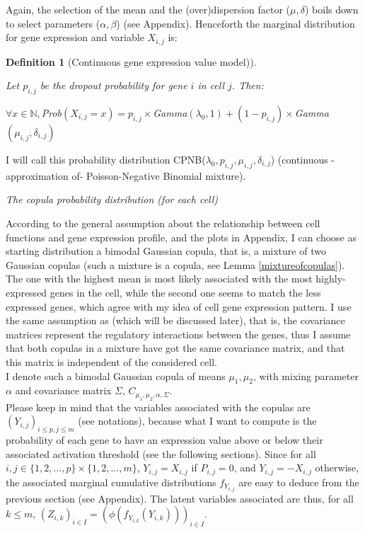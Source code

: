 \documentclass{report}
\newtheorem{definition}{Definition}[section]
\begin{document}
{Again, the selection of the mean and the (over)dispersion factor ($\mu, \delta$) boils down to select parameters ($\alpha, \beta$) (see Appendix). Henceforth the marginal distribution for gene expression and variable $X_{i,j}$ is:

\begin{definition}[Continuous gene expression value model)]\label{genexpressioncontinuous}{Let $p_{i,j}$ be the dropout probability for gene $i$ in cell $j$. Then:
\begin{center}$\forall x \in \mathbb{N}, $\textit{Prob}$(X_{i,j} = x) = p_{i,j} \times $\textit{Gamma}$(\lambda_0, 1) + (1-p_{i,j}) \times $\textit{Gamma}$(\mu_{i,j}, \delta_{i,j})$\end{center}}\end{definition}

I will call this probability distribution CPNB($\lambda_0, p_{i,j}, \mu_{i,j}, \delta_{i,j}$) (continuous -approximation of- Poisson-Negative Binomial mixture).

\bigskip
\noindent \textit{The copula probability distribution (for each cell)}
\bigskip

According to the general assumption about the relationship between cell functions and gene expression profile, and the plots in Appendix, I can choose as starting distribution a bimodal Gaussian copula, that is, a mixture of two Gaussian copulas (such a mixture is a copula, see Lemma \ref{mixtureofcopulas}). The one with the highest mean is most likely associated with the most highly-expressed genes in the cell, while the second one seems to match the less expressed genes, which agree with my idea of cell gene expression pattern. I use the same assumption as \cite{zhang2017classification} (which will be discussed later), that is, the covariance matrices represent the regulatory interactions between the genes, thus I assume that both copulas in a mixture have got the same covariance matrix, and that this matrix is independent of the considered cell.\\

I denote such a bimodal Gaussian copula of means $\mu_1, \mu_2$, with mixing parameter $\alpha$ and covariance matrix $\Sigma$, $C_{\mu_1, \mu_2, \alpha, \Sigma}$.\\

Please keep in mind that the variables associated with the copulas are $(Y_{i,j})_{i \leq p, j \leq m}$ (see notations), because what I want to compute is the probability of each gene to have an expression value above or below their associated activation threshold (see the following sections). Since for all $i,j \in \{1,2,...,p\} \times \{1,2,...,m\}$, $Y_{i,j} = X_{i,j}$ if $P_{i,j} = 0$, and $Y_{i,j} = -X_{i,j}$ otherwise, the associated marginal cumulative distributions $f_{Y_{i,j}}$ are easy to deduce from the previous section (see Appendix). The latent variables associated are thus, for all $k \leq m$, $(Z_{i,k})_{i \in I} = (\phi(f_{Y_{i,k}}(Y_{i,k})))_{i \in I}$.

}
\end{document}
